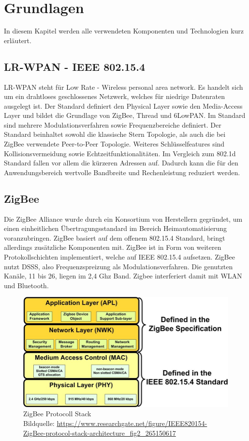 \chapter{Grundlagen}

In diesem Kapitel werden alle verwendeten Komponenten und Technologien kurz erläutert.

\section{LR-WPAN - IEEE 802.15.4}

LR-WPAN \cite{lrwpan} steht für \grqq Low Rate - Wireless personal area network\grqq{}. Es handelt sich um ein drahtloses geschlossenes Netzwerk, welches für 
niedrige Datenraten ausgelegt ist. Der Standard definiert den Physical Layer sowie den Media-Access Layer und bildet die Grundlage von ZigBee, Thread und 6LowPAN.
Im Standard sind mehrere Modulationsverfahren sowie Frequenzbereiche definiert. Der Standard beinhaltet sowohl die klassische Stern Topologie, als auch die bei 
ZigBee verwendete Peer-to-Peer Topologie. Weiteres Schlüsselfeatures sind Kollisionsvermeidung sowie Echtzeitfunktionalitäten. Im Vergleich zum 802.1d Standard 
fallen vor allem die kürzeren Adressen auf. Dadurch kann die für den Anwendungsbereich wertvolle Bandbreite und Rechenleistung reduziert werden. 

\section{ZigBee}

Die ZigBee Alliance wurde durch ein Konsortium von Herstellern gegründet, um einen einheitlichen Übertragungsstandard
im Bereich Heimautomatisierung voranzubringen. ZigBee basiert auf dem offenem 802.15.4 Standard, bringt allerdings zusätzliche Komponenten mit.
ZigBee ist in Form von weiteren Protokollschichten implementiert, welche auf IEEE 802.15.4 aufsetzen. ZigBee nutzt DSSS, also Frequenzspreizung als Modulationsverfahren.
Die genutzten Kanäle, 11 bis 26, liegen im 2,4 Ghz Band. Zigbee interferiert damit mit WLAN und Bluetooth.

\begin{figure}[H]
  \centering
  \includegraphics[width=1\textwidth]{media/Zigbee Stack.jpg}
  \caption{ZigBee Protocoll Stack \\ Bildquelle: \url{https://www.researchgate.net/figure/IEEE820154-ZigBee-protocol-stack-architecture_fig2_265150617}}
\end{figure}

